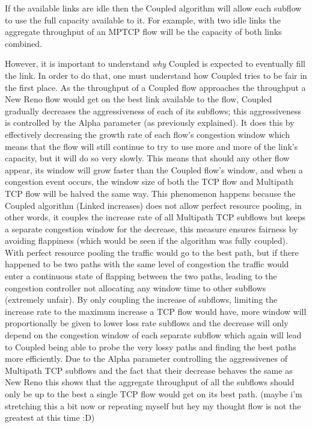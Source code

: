 If the available links are idle then the Coupled algorithm will allow each
subflow to use the full capacity available to it. For example, with two idle
links the aggregate throughput of an MPTCP flow will be the capacity of both
links combined.



However, it is important to understand \textit{why} Coupled is expected to
eventually fill the link. In order to do that, one must understand how Coupled
tries to be fair in the first place. As the throughput of a Coupled flow
approaches the throughput a New Reno flow would get on the best link available
to the flow, Coupled gradually decreases the aggressiveness of each of its
subflows; this aggressiveness is controlled by the Alpha parameter (as
previously explained). It does this by effectively decreasing the growth rate of
each flow's congestion window which means that the flow will still continue to
try to use more and more of the link's capacity, but it will do so very slowly.
This means that should any other flow appear, its window will grow faster than
the Coupled flow's window, and when a congestion event occurs, the window size
of both the TCP flow and Multipath TCP flow will be halved the same way. This
phenomenon happens because the Coupled algorithm (Linked increases) does not
allow perfect resource pooling, in other words, it couples the increase rate of
all Multipath TCP subflows but keeps a separate congestion window for the
decrease, this measure ensures fairness by avoiding flappiness (which would be
seen if the algorithm was fully coupled). With perfect resource pooling the
traffic would go to the best path, but if there happened to be two paths with
the same level of congestion the traffic would enter a continuous state of
flapping between the two paths, leading to the congestion controller not
allocating any window time to other subflows (extremely unfair). By only
coupling the increase of subflows, limiting the increase rate to the maximum
increase a TCP flow would have, more window will proportionally be given to
lower loss rate subflows and the decrease will only depend on the congestion
window of each separate subflow which again will lead to Coupled being able to
probe the very lossy paths and finding the best paths more efficiently.  Due to
the Alpha parameter controlling the aggressivenes of Multipath TCP subflows and
the fact that their decrease behaves the same as New Reno this shows that the
aggregate throughput of all the subflows should only be up to the best a single
TCP flow would get on its best path. (maybe i'm stretching this a bit now or
repeating myself but hey my thought flow is not the greatest at this
time :D)  %

